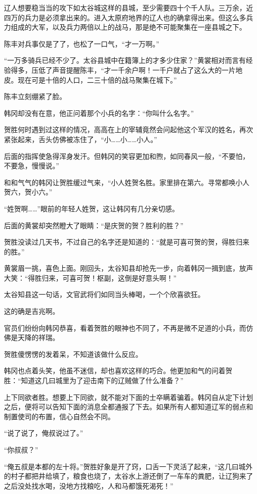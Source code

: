 辽人想要稳当当的攻下如太谷城这样的县城，至少需要四十个千人队。三万余，近四万的兵力是必须拿出来的。进入太原府地界的辽人也的确拿得出来。但这么多兵力组成的大军，以及兵力两倍以上的战马，那是绝不可能聚集在一座县城之下。

陈丰对兵事仅是了了，也松了一口气，“才一万啊。”

“一万多骑兵已经不少了。太谷县城中在籍簿上的才多少住家？”黄裳相对而言有经验得多，压低了声音提醒陈丰，“才一千余户啊！一千户就占了这么大的一片地皮。现在可是十倍的人口，二三十倍的战马聚集在城下。”

陈丰立刻绷紧了脸。

韩冈却没有在意，他正问着那个小兵的名字：“你叫什么名字。”

贺胜何时遇到过这样的情况，高高在上的宰辅竟然会问起他这个军汉的姓名，再次紧张起来，舌头仿佛被冻住了，“小……小……小人。”

后面的指挥使急得浑身发汗。但韩冈的笑容更加和煦，如同春风一般，“不要怕，不要急，慢慢说。”

和和气气的韩冈让贺胜缓过气来，“小人姓贺名胜。家里排在第六。寻常都唤小人贺六，贺小六。”

“姓贺啊……”眼前的年轻人姓贺，这让韩冈有几分亲切感。

后面的黄裳却突然瞪大了眼睛：“是庆贺的贺？胜利的胜？”

贺胜没读过几天书，不过自己的名字还是知道的：“就是可喜可贺的贺，得胜归来的胜。”

黄裳眉一挑，喜色上面。刚回头，太谷知县却抢先一步，向着韩冈一揖到底，放声大笑：“得胜归来，可喜可贺！枢副，这倒是好意头啊！”

太谷知县这一句话，文官武将们如同当头棒喝，一个个欣喜欲狂。

这的确是吉兆啊。

官员们纷纷向韩冈恭喜，看着贺胜的眼神也不同了，不再是微不足道的小兵，而仿佛是天降的祥瑞。

贺胜傻愣愣的发着呆，不知道该做什么反应。

韩冈也点着头笑，他虽不迷信，却也喜欢这样的巧合。他更加和气的问着贺胜：“知道这几曰城里为了迎击南下的辽贼做了什么准备？”

上下同欲者胜。想要上下同欲，就不能对下面的士卒瞒着骗着。韩冈自从定下计划之后，便将可以告知下面的消息全都通报了下去。如果所有人都知道辽军的弱点和制置使司的布置，信心自然会不同。

“说了说了，俺叔说过了。”

“你叔叔？”

“俺五叔是本都的左十将。”贺胜好象是开了窍，口舌一下灵活了起来，“这几曰城外的村子都把井给填了，粮食也烧了，太谷水上游还倒了一车车的粪肥，让辽狗来了之后没处找水喝，没地方找粮吃，人和马都饿死渴死！”

